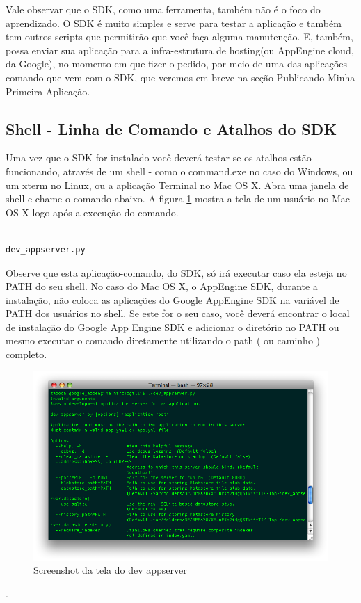\documentclass[a4paper]{article}
\begin{document}
Vale observar que o SDK, como uma ferramenta, também não é o foco do aprendizado. O SDK é muito simples e serve para testar a aplicação e também tem outros scripts que permitirão que você faça alguma manutenção. E, também,  possa enviar sua aplicação para a infra-estrutura de hosting(ou AppEngine cloud, da Google), no momento em que fizer o pedido, por meio de uma das aplicações-comando que vem com o SDK, que veremos em breve na seção Publicando Minha Primeira Aplicação. 


\subsection{Shell - Linha de Comando e Atalhos do SDK}

Uma vez que o SDK for instalado você deverá testar se os atalhos estão funcionando, através de um shell - como o command.exe no caso do Windows, ou um xterm no Linux, ou a aplicação Terminal no Mac OS X. Abra uma janela de shell e chame o comando abaixo. A figura \ref{fig:appengine-sdk} mostra a tela de um usuário no Mac OS X logo após a execução do comando.  


\begin{verbatim}

dev_appserver.py

\end{verbatim}

Observe que esta aplicação-comando, do SDK, só irá executar caso ela esteja no PATH do seu shell. No caso do Mac OS X, o AppEngine SDK, durante a instalação, não coloca as aplicações do Google AppEngine SDK na variável de PATH dos usuários no shell. Se este for o seu caso, você deverá encontrar o local de instalação do Google App Engine SDK e adicionar o diretório no PATH ou mesmo executar o comando diretamente utilizando o path ( ou caminho ) completo. 


\begin{figure}[!h]
\centering
\includegraphics[width=5in]{image-dev_appserver.png}
\caption{Screenshot da tela do dev appserver}
\label{fig:appengine-sdk}
\end{figure}.
\end{document}
